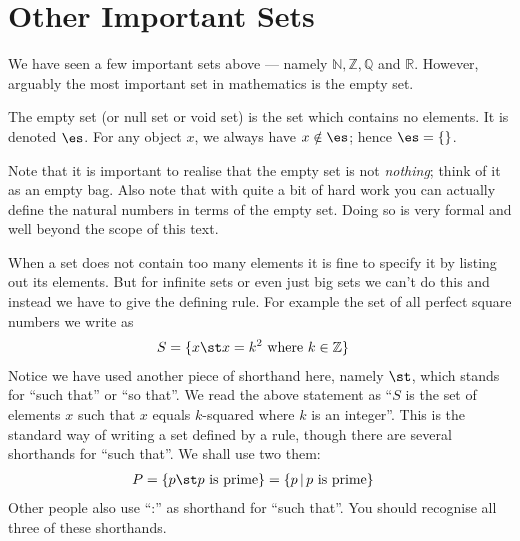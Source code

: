 \section{Other Important Sets}\label{sec_0_3}
We have seen a few important sets above --- namely $\mathbb{N}, \mathbb{Z},
\mathbb{Q}$ and $\mathbb{R}$. However, arguably the most important set in
mathematics is the empty set.
\begin{defn}\label{def_0_3_1}
  The empty set (or null set or void set) is the set which contains no
elements. It is denoted $\es$. For any object $x$, we always
have $x \notin \es$; hence $\es = \{ \}$.
\end{defn}
Note that it is important to realise that the empty set is not \emph{nothing}; think of it
as an empty bag. Also note that with quite a bit of hard work you can actually define the
natural numbers in terms of the empty set. Doing so is very formal and well beyond the
scope of this text.


When a set does not contain too many elements it is fine to specify it by listing out its
elements.  But for infinite sets or even just big sets we can't do this and instead we
have to give the defining rule. For example the set of all perfect square numbers we
write as
\begin{align*}
  S &= \{x \st x = k^2 \mbox{ where } k \in \mathbb{Z} \}
\end{align*}
Notice we have used another piece of shorthand here, namely $\st$, which
stands for ``such that'' or ``so that''. We read the above statement as ``$S$ is
the set of elements $x$ such that $x$ equals $k$-squared where $k$ is an
integer''. This is the standard way of writing a set defined by a rule, though there are
several shorthands for ``such that''. We shall use two them:
\begin{align*}
  P &= \{ p \st p \mbox{ is prime} \} = \{ p \,|\, p \mbox{ is prime} \}
\end{align*}
Other people also use ``:'' as shorthand for ``such that''. You should
recognise all three of these shorthands.

